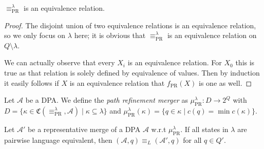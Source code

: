 \vspace{5pt}

\begin{lem}
	$\equiv_\text{PR}^\lambda$ is an equivalence relation.
\end{lem}

\begin{proof}
	The disjoint union of two equivalence relations is an equivalence relation, so we only focus on $\lambda$ here; it is obvious that $\equiv_\text{PR}^\lambda$ is an equivalence relation on $Q \setminus \lambda$.
	
	We can actually observe that every $X_i$ is an equivalence relation. For $X_0$ this is true as that relation is solely defined by equivalence of values. Then by induction it easily follows if $X$ is an equivalence relation that $f_\text{PR}(X)$ is one as well.
\end{proof}

\begin{defn}
	Let $\mathcal{A}$ be a DPA. We define the \emph{path refinement merger} as $\mu_\text{PR}^\lambda : D \rightarrow 2^Q$ with $D = \{ \kappa \in \mathfrak{C}(\equiv_\text{PR}^\lambda, \mathcal{A}) \mid \kappa \subseteq \lambda \}$ and $\mu_\text{PR}^\lambda(\kappa) = \{ q \in \kappa \mid c(q) = \min c(\kappa) \}$.
\end{defn}

\vspace{10pt}

\begin{theorem}
	Let $\mathcal{A}'$ be a representative merge of a DPA $\mathcal{A}$ w.r.t $\mu_\text{PR}^\lambda$. If all states in $\lambda$ are pairwise language equivalent, then $(\mathcal{A}, q) \equiv_L (\mathcal{A}', q)$ for all $q \in Q'$.
	\label{thm:pr:preserves_language}
\end{theorem}

